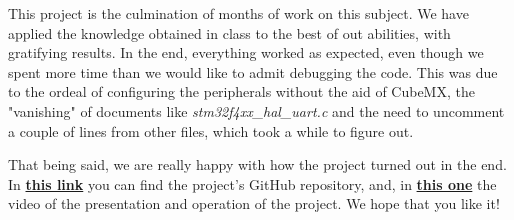 This project is the culmination of months of work on this subject. We have applied the knowledge obtained in class to the best of out abilities, with gratifying results. In the end, everything worked as expected, even though we spent more time than we would like to admit debugging the code. This was due to the ordeal of configuring the peripherals without the aid of CubeMX, the "vanishing" of documents like \textit{stm32f4xx\_hal\_uart.c} and the need to uncomment a couple of lines from other files, which took a while to figure out. \medskip

That being said, we are really happy with how the project turned out in the end. In \href{https://github.com/anacalo24/MicroProject}{\textbf{this link}} you can find the project's GitHub repository, and, in \href{}{\textbf{this one}} the video of the presentation and operation of the project. We hope that you like it!
